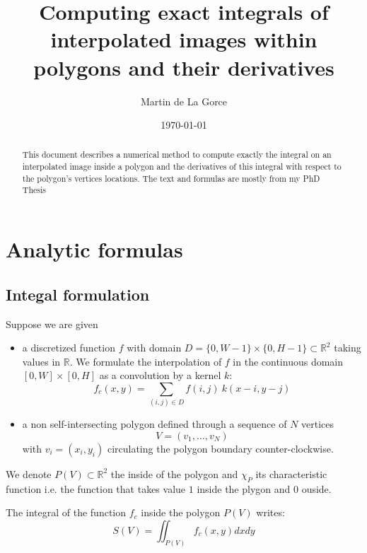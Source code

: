 \documentclass[11pt]{article}
\begin{document}
\title{Computing exact integrals of interpolated images within polygons and their derivatives}
\author{Martin de La Gorce}
\date{\today}
\maketitle

\begin{abstract}
   This document describes a numerical method to compute exactly the integral on an interpolated image inside a polygon and the derivatives of this integral with respect to the polygon's vertices locations. The text and formulas are mostly from my PhD Thesis \cite{DeLaGorce2009}
\end{abstract}


\section{Analytic formulas}

\subsection{Integal formulation}
Suppose we are given  
\begin{itemize}
\item a discretized function $f$ with domain $D=\{0,W-1\}\times\{0,H-1\}\subset \mathbb{R}^2$ taking values in $\mathbb R$. 
We formulate the interpolation of $f$ in the continuous domain $[0,W]\times[0,H]$ as a convolution by a kernel $k$:
\begin{equation}
f_c(x,y)=\sum_{(i,j)\in D} f(i,j) ~k(x-i,y-j)
\end{equation}

\item a non self-intersecting polygon defined through a sequence of $N$ vertices $$V=(v_1,\dots,v_N)$$ with $v_i=(x_i,y_i)$ circulating the polygon boundary counter-clockwise.
\end{itemize}
We denote $P(V)\subset \mathbb{R}^2$ the inside of the polygon and $\chi_P$ its characteristic function i.e. the function that takes value $1$ inside the plygon and $0$ ouside.

 The integral of the function $f_c$ inside the polygon $P(V)$ writes:
\
\begin{equation}
S(V)=\iint_{P(V)}f_c(x,y)dxdy
\label{eqn:integralef}
\end{equation}
\end{document}
